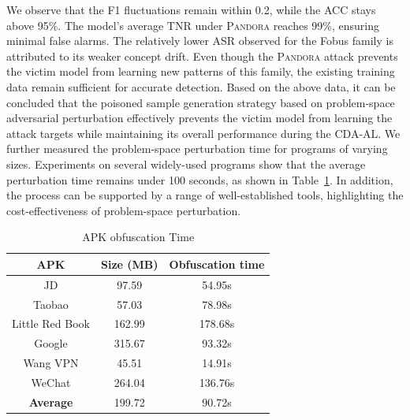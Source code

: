 \documentclass[lettersize,journal]{IEEEtran}
\newcommand{\pandora}{{\scshape Pandora}\xspace}
\begin{document}
We observe that the F1 fluctuations remain within 0.2, while the ACC stays above 95\%.
The model’s average TNR under \pandora reaches 99\%, ensuring minimal false alarms.
The relatively lower ASR observed for the Fobus family is attributed to its weaker concept drift.
Even though the \pandora attack prevents the victim model from learning new patterns of this family, the existing training data remain sufficient for accurate detection.
Based on the above data, it can be concluded that the poisoned sample generation strategy based on problem-space adversarial perturbation effectively prevents the victim model from learning the attack targets while maintaining its overall performance during the CDA-AL. 
We further measured the problem-space perturbation time for programs of varying sizes.
Experiments on several widely-used programs show that the average perturbation time remains under 100 seconds, as shown in Table~\ref{tab: APK obfdxuscation time}.
In addition, the process can be supported by a range of well-established tools, highlighting the cost-effectiveness of problem-space perturbation.
\begin{table}[h!]
	\centering
	\small
	\renewcommand{\arraystretch}{0.8}
	\caption{APK obfuscation Time}
	\label{tab: APK obfdxuscation time}
	\begin{tabular}{c|c|c}
		\toprule
		\textbf{APK} & \textbf{Size (MB)} & \textbf{Obfuscation time} \\
		\midrule
		JD & 97.59 & 54.95s \\
		Taobao & 57.03 & 78.98s \\
		Little Red Book & 162.99 & 178.68s \\
		Google & 315.67 & 93.32s \\
		Wang VPN & 45.51 & 14.91s \\
		WeChat & 264.04 & 136.76s \\
		\midrule
		\textbf{Average} & 199.72 & 90.72s \\
		\bottomrule
	\end{tabular}
\end{table}
\end{document}
